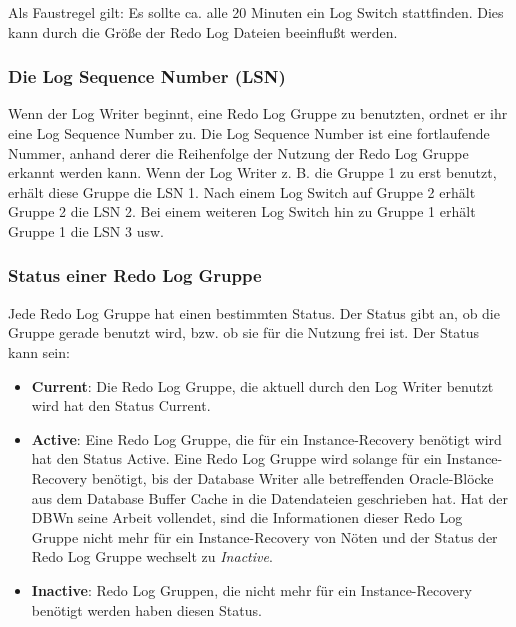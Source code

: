             \begin{merke}
              Als Faustregel gilt: Es sollte ca. alle 20 Minuten ein Log Switch stattfinden. Dies kann durch die Größe der Redo Log Dateien beeinflußt werden.
            \end{merke}
          \subsubsection{Die Log Sequence Number (LSN)}
            Wenn der Log Writer beginnt, eine Redo Log Gruppe zu benutzten, ordnet er ihr eine Log Sequence Number zu. Die Log Sequence Number ist eine fortlaufende Nummer, anhand derer die Reihenfolge der Nutzung der Redo Log Gruppe erkannt werden kann. Wenn der Log Writer z. B. die Gruppe 1 zu erst benutzt, erhält diese Gruppe die LSN 1. Nach einem Log Switch auf Gruppe 2 erhält Gruppe 2 die LSN 2. Bei einem weiteren Log Switch hin zu Gruppe 1 erhält Gruppe 1 die LSN 3 usw.
          \subsubsection{Status einer Redo Log Gruppe}
            Jede Redo Log Gruppe hat einen bestimmten Status. Der Status gibt an, ob die Gruppe gerade benutzt wird, bzw. ob sie für die Nutzung frei ist. Der Status kann sein:
            \begin{itemize}
              \item \textbf{Current}: Die Redo Log Gruppe, die aktuell durch den
              Log Writer benutzt wird hat den Status Current.
              \item \textbf{Active}: Eine Redo Log Gruppe, die für ein
              Instance-Recovery benötigt wird hat den Status Active. Eine Redo
              Log Gruppe wird solange für ein Instance-Recovery benötigt,
              bis der Database Writer alle betreffenden Oracle-Blöcke aus dem
              Database Buffer Cache in die Datendateien geschrieben hat. Hat der
              DBWn seine Arbeit vollendet, sind die Informationen dieser Redo
              Log Gruppe nicht mehr für ein Instance-Recovery von Nöten und
              der Status der Redo Log Gruppe wechselt zu \textit{Inactive}.
              \item \textbf{Inactive}: Redo Log Gruppen, die nicht mehr für
              ein Instance-Recovery benötigt werden haben diesen Status.
            \end{itemize}

